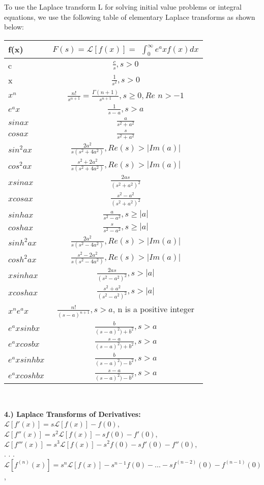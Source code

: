\documentclass[12pt]{article}
\begin{document}
{To use the Laplace transform L for solving initial value problems or integral equations, we use the following table of elementary Laplace transforms as shown below:\\
\begin{tabular}{| l | c | } \hline 
f(x) & $F(s) = \mathcal{L}[f(x)] =$ \(\int_{0}^{\infty} e^ax f(x) dx\)\\
\hline
c & $\frac{c}{s}, s > 0$\\
x & $\frac{1}{s^2}, s > 0$\\
$x^n$ & $\frac{n!}{s^{n +1}} = \frac{\Gamma (n + 1)}{s^{n + 1}}, s \geq 0, Re$ $n > -1$\\
$e^ax$ & $\frac{1}{s - a}, s > a$\\
$sin ax$ & $\frac{a}{s^2 + a^2}$\\ 
$cos ax$ & $\frac{s}{s^2 + a^2}$\\ 
$sin^2 ax$ & $\frac{2a^2}{s(s^2 + 4 a^2)}, Re(s) > |Im(a)|$\\ 
$cos^2 ax$ & $\frac{s^2 + 2a^2}{s(s^2 + 4 a^2)}, Re(s) > |Im(a)|$\\ 
$xsin ax$ & $\frac{2as}{(s^2 + a^2)^2}$\\ 
$xcos ax$ & $\frac{s^2 - a^2}{(s^2 + a^2)^2}$\\ 
$sinh ax$ & $\frac{a}{s^2 - a^2}, s \geq |a|$\\ 
$cosh ax$ & $\frac{s}{s^2 - a^2}, s \geq |a|$\\ 
$sinh^2 ax$ & $\frac{2a^2}{s(s^2 - 4 a^2)}, Re(s) > |Im(a)|$\\ 
$cosh^2 ax$ & $\frac{s^2 - 2a^2}{s(s^2 - 4 a^2)}, Re(s) > |Im(a)|$\\ 
$xsinh ax$ & $\frac{2as}{(s^2 - a^2)^2}, s > |a|$\\ 
$xcosh ax$ & $\frac{s^2 + a^2}{(s^2 - a^2)^2}, s > |a|$\\ 
$x^n e^ax$ & $\frac{n!}{(s - a)^{n + 1}}, s > a$, n is a positive integer\\ 
$e^ax sinbx$ & $\frac{b}{(s - a)^2) + b^2}, s > a$\\ 
$e^ax cosbx$ & $\frac{s - a}{(s - a)^2) + b^2}, s > a$\\ 
$e^ax sinhbx$ & $\frac{b}{(s - a)^2) - b^2}, s > a$\\ 
$e^ax coshbx$ & $\frac{s - a}{(s - a)^2) - b^2}, s > a$\\ 
\hline
\end{tabular}
\\
\par \textbf{4.)	Laplace Transforms of Derivatives:}\\
	$\mathcal{L}[f'(x)] = s \mathcal{L}[f(x)] - f(0)$,\\
	$\mathcal{L}[f''(x)] = s^2 \mathcal{L}[f(x)] - sf(0) - f'(0)$,\\
	$\mathcal{L}[f'''(x)] = s^3 \mathcal{L}[f(x)] - s^2f(0) - sf'(0) - f''(0)$,\\
			.
			.
			.\\
	$\mathcal{L}[f^{(n)} (x)] = s^n \mathcal{L}[f(x)] - s^{n - 1} f(0) -... - sf^{(n - 2)}(0) - f^{(n - 1)}(0)$,\\

}
\end{document}
